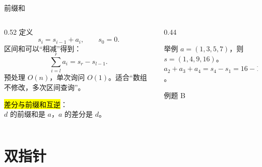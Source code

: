 \documentclass[aspectratio=169]{beamer}
\begin{document}
\begin{frame}{前缀和}
    \begin{columns}[T]
        \begin{column}{0.52\textwidth}
            \small
            定义
            \[
                s_i=s_{i-1}+a_i,\qquad s_0=0.
            \]
            区间和可以“相减”得到：
            \[
                \sum_{i=l}^{r}a_i=s_r-s_{l-1}.
            \]
            预处理 $O(n)$，单次询问 $O(1)$。适合“数组不修改，多次区间查询”。

            \vspace{0.5em}
            \hl{差分与前缀和互逆}：\\
            $d$ 的前缀和是 $a$，$a$ 的差分是 $d$。
        \end{column}
        \begin{column}{0.44\textwidth}
            \begin{exampleblock}{举例}
                \footnotesize
                $a=(1,3,5,7)$，则 $s=(1,4,9,16)$。\\
                $a_2+a_3+a_4=s_4-s_1=16-1=15$。
            \end{exampleblock}
            \vspace{1em}
            例题 B
        \end{column}
    \end{columns}
\end{frame}

\section{双指针}
\end{document}
